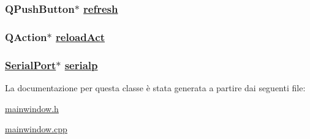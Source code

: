 \hypertarget{classMainWindow_07ba2d7080a0f0cf1ab683bfe6b80156}{
\subsubsection[refresh]{\setlength{\rightskip}{0pt plus 5cm}QPush\-Button$\ast$ \hyperlink{classMainWindow_07ba2d7080a0f0cf1ab683bfe6b80156}{refresh}}}
\label{classMainWindow_07ba2d7080a0f0cf1ab683bfe6b80156}


\hypertarget{classMainWindow_168587cb4c00ec6773174b004268191d}{
\subsubsection[reloadAct]{\setlength{\rightskip}{0pt plus 5cm}QAction$\ast$ \hyperlink{classMainWindow_168587cb4c00ec6773174b004268191d}{reload\-Act}}}
\label{classMainWindow_168587cb4c00ec6773174b004268191d}


\hypertarget{classMainWindow_730a1b78e42ee50b10b26f34e4bf8b1e}{
\subsubsection[serialp]{\setlength{\rightskip}{0pt plus 5cm}\hyperlink{classSerialPort}{Serial\-Port}$\ast$ \hyperlink{classMainWindow_730a1b78e42ee50b10b26f34e4bf8b1e}{serialp}}}
\label{classMainWindow_730a1b78e42ee50b10b26f34e4bf8b1e}




La documentazione per questa classe \`{e} stata generata a partire dai seguenti file:\begin{CompactItemize}
\item 
\hyperlink{mainwindow_8h}{mainwindow.h}\item 
\hyperlink{mainwindow_8cpp}{mainwindow.cpp}\end{CompactItemize}
